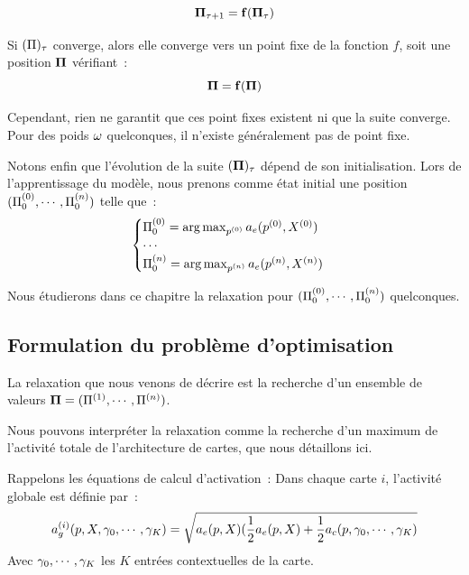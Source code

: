 \documentclass[../main]{subfiles}
\begin{document}
\begin{equation}
\mathbf{\Pi}_{\tau+1} = \mathbf{f}(\mathbf{\Pi}_\tau)
\end{equation}

Si $(\Pi)_\tau$ converge, alors elle converge vers un point fixe de la fonction $f$, soit une position $\mathbf{\Pi}$ vérifiant~:
\begin{equation}
\mathbf{\Pi} = \mathbf{f}(\mathbf{\Pi})
\label{eq:suite}
\end{equation}

Cependant, rien ne garantit que ces point fixes existent ni que la suite converge.
Pour des poids $\omega$ quelconques, il n'existe généralement pas de point fixe.

Notons enfin que l'évolution de la suite $(\mathbf{\Pi})_{\tau}$ dépend de son initialisation.
Lors de l'apprentissage du modèle, nous prenons comme état initial une position $(\Pi^{({0})}_0, \cdots , \Pi^{({n})}_0)$  telle que~: 
\begin{equation}
\begin{cases}
\Pi^{({0})}_0 = \operatorname*{arg\,max}_{p^{({0})}} a_e(p^{({0})},X^{({0})})\\
\cdots \\
\Pi^{({n})}_0 = \operatorname*{arg\,max}_{p^{({n})}} a_e(p^{({n})},X^{({n})})\\
\end{cases}
\label{eq:init}
\end{equation}

Nous étudierons dans ce chapitre la relaxation pour $(\Pi^{({0})}_0, \cdots , \Pi^{({n})}_0)$ quelconques.

\subsection{Formulation du problème d'optimisation}

La relaxation que nous venons de décrire est la recherche d'un ensemble de valeurs $\mathbf{\Pi} = (\Pi^{({1})}, \cdots, \Pi^{({n})})$.

Nous pouvons interpréter la relaxation comme la recherche d'un maximum de l'activité totale de l'architecture de cartes, que nous détaillons ici. 

Rappelons les équations de calcul d'activation~:
Dans chaque carte $i$, l'activité globale est définie par~:
\begin{equation}\label{eq:ag}
	a_g^{({i})}(p, X, \gamma_0, \cdots, \gamma_K) = \sqrt{a_e(p,X)(\frac{1}{2}a_e(p,X) + \frac{1}{2}a_c(p,\gamma_0, \cdots, \gamma_K)}
\end{equation}
Avec $\gamma_0, \cdots, \gamma_K$ les $K$ entrées contextuelles de la carte. 
\end{document}
